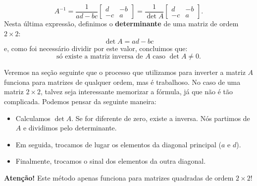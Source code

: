 \documentclass[../livro.tex]{subfiles}  %
\begin{document}
\begin{equation}
\boxed{A^{-1} = \frac{1}{ad - bc} \left[
	\begin{array}{cc}
	d  & -b  \\
	-c & a 
	\end{array}
	\right] =
	\frac{1}{\det A} \left[
	\begin{array}{cc}
	d  & -b  \\
	-c & a 
	\end{array}
	\right].}
\end{equation} Nesta última expressão, definimos o \textbf{determinante} de uma matriz de ordem $2\times 2$:
\begin{equation}
\det A = ad - bc
\end{equation} e, como foi necessário dividir por este valor, concluimos que:
\begin{equation}
\boxed{\text{só existe a matriz inversa de $A$ caso $\det A \neq 0$.}}
\end{equation}


\begin{remark}
	Veremos na seção seguinte que o processo que utilizamos para inverter a matriz $A$ funciona para matrizes de qualquer ordem, mas é trabalhoso. No caso de uma matriz $2\times 2$, talvez seja interessante memorizar a fórmula, já que não é tão complicada. Podemos pensar da seguinte maneira:
	\begin{itemize}
		\item Calculamos $\det A$. Se for diferente de zero, existe a inversa. Nós partimos de $A$ e dividimos pelo determinante.
		\item Em seguida, trocamos de lugar os elementos da diagonal principal ($a$ e $d$).
		\item Finalmente, trocamos o sinal dos elementos da outra diagonal.
	\end{itemize}
	\textbf{Atenção!} Este método apenas funciona para matrizes quadradas de ordem $2\times 2$!
\end{remark}
\end{document}
